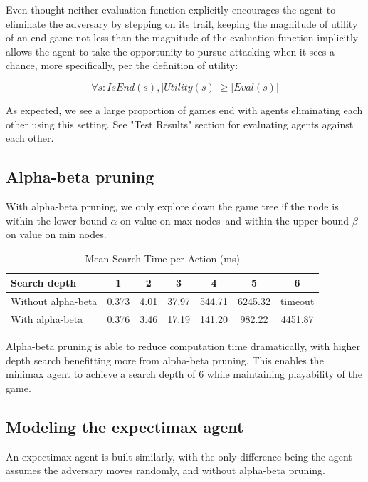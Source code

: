 \documentclass{article}
\begin{document}
Even thought neither evaluation function explicitly encourages the agent to eliminate the adversary by stepping on its trail, keeping the magnitude of utility of an end game not less than the magnitude of the evaluation function implicitly allows the agent to take the opportunity to pursue attacking when it sees a chance, more specifically, per the definition of utility:

\[
\forall s: IsEnd(s), |Utility(s)| \ge |Eval(s)|
\]

As expected, we see a large proportion of games end with agents eliminating each other using this setting. See "Test Results" section for evaluating agents against each other.

\subsection{Alpha-beta pruning}

With alpha-beta pruning, we only explore down the game tree if the node is within the lower bound $\alpha$ on value on max nodes\, and within the upper bound $\beta$ on value on min nodes. 

\begin{table}[H]
\centering
\caption{Mean Search Time per Action (ms)}
\label{tab:alphabeta}
\begin{tabular}{lcccccc}
\hline
Search depth       & 1     & 2    & 3     & 4      & 5       & 6       \\ \hline
Without alpha-beta & 0.373 & 4.01 & 37.97 & 544.71 & 6245.32 & timeout \\
With alpha-beta    & 0.376 & 3.46 & 17.19 & 141.20 & 982.22  & 4451.87 \\ \hline
\end{tabular}
\end{table}

Alpha-beta pruning is able to reduce computation time dramatically, with higher depth search benefitting more from alpha-beta pruning. This enables the minimax agent to achieve a search depth of 6 while maintaining playability of the game.


\subsection{Modeling the expectimax agent}

An expectimax agent is built similarly, with the only difference being the agent assumes the adversary moves randomly, and without alpha-beta pruning.
\end{document}

